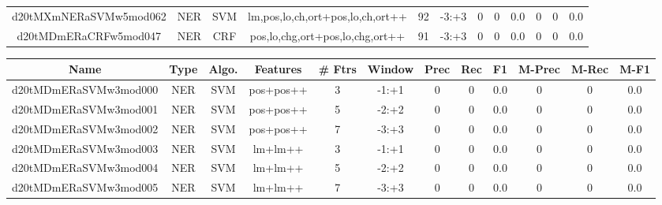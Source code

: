 \documentclass[a4paper]{article}
\begin{document}
\begin{landscape}
\begin{center}
\begin{tabular}{ |c|c|c|c|c|c|c|c|c|c|c|c|}
 
 	
 	\small{ d20tMXmNERaSVMw5mod062 } & \small{ NER} & \small{  SVM }  & lm,pos,lo,ch,ort+pos,lo,ch,ort++  &  92 &  \small{  -3:+3 }  &  0 & 0 & 0.0  &  0 & 0 & 0.0 \\
 	

 
 	
 	\small{ d20tMDmERaCRFw5mod047 } & \small{ NER} & \small{  CRF }  & pos,lo,chg,ort+pos,lo,chg,ort++  &  91 &  \small{  -3:+3 }  &  0 & 0 & 0.0  &  0 & 0 & 0.0 \\
 	
 \hline
\end{tabular}
\end{center}




\begin{center}
\begin{tabular}{ |c|c|c|c|c|c|c|c|c|c|c|c|} 
 \hline
 	Name & Type & Algo. & Features & \# Ftrs & Window & Prec & Rec & F1 & M-Prec & M-Rec & M-F1\\
 \hline

 	

 
 	
 	\small{ d20tMDmERaSVMw3mod000 } & \small{ NER} & \small{  SVM }  & pos+pos++  &  3 &  \small{  -1:+1 }  &  0 & 0 & 0.0  &  0 & 0 & 0.0 \\
 	

 
 	
 	\small{ d20tMDmERaSVMw3mod001 } & \small{ NER} & \small{  SVM }  & pos+pos++  &  5 &  \small{  -2:+2 }  &  0 & 0 & 0.0  &  0 & 0 & 0.0 \\
 	

 
 	
 	\small{ d20tMDmERaSVMw3mod002 } & \small{ NER} & \small{  SVM }  & pos+pos++  &  7 &  \small{  -3:+3 }  &  0 & 0 & 0.0  &  0 & 0 & 0.0 \\
 	

 
 	
 	\small{ d20tMDmERaSVMw3mod003 } & \small{ NER} & \small{  SVM }  & lm+lm++  &  3 &  \small{  -1:+1 }  &  0 & 0 & 0.0  &  0 & 0 & 0.0 \\
 	

 
 	
 	\small{ d20tMDmERaSVMw3mod004 } & \small{ NER} & \small{  SVM }  & lm+lm++  &  5 &  \small{  -2:+2 }  &  0 & 0 & 0.0  &  0 & 0 & 0.0 \\
 	

 
 	
 	\small{ d20tMDmERaSVMw3mod005 } & \small{ NER} & \small{  SVM }  & lm+lm++  &  7 &  \small{  -3:+3 }  &  0 & 0 & 0.0  &  0 & 0 & 0.0 \\
 	


\end{tabular}
\end{center}
\end{landscape}
\end{document}
